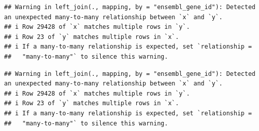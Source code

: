 \documentclass[
]{article}
\newenvironment{Shaded}{\begin{snugshade}}{\end{snugshade}}
\newcommand{\AttributeTok}[1]{\textcolor[rgb]{0.13,0.29,0.53}{#1}}
\newcommand{\CommentTok}[1]{\textcolor[rgb]{0.56,0.35,0.01}{\textit{#1}}}
\newcommand{\ConstantTok}[1]{\textcolor[rgb]{0.56,0.35,0.01}{#1}}
\newcommand{\DecValTok}[1]{\textcolor[rgb]{0.00,0.00,0.81}{#1}}
\newcommand{\FunctionTok}[1]{\textcolor[rgb]{0.13,0.29,0.53}{\textbf{#1}}}
\newcommand{\NormalTok}[1]{#1}
\newcommand{\OtherTok}[1]{\textcolor[rgb]{0.56,0.35,0.01}{#1}}
\newcommand{\SpecialCharTok}[1]{\textcolor[rgb]{0.81,0.36,0.00}{\textbf{#1}}}
\newcommand{\StringTok}[1]{\textcolor[rgb]{0.31,0.60,0.02}{#1}}
\begin{document}
\begin{verbatim}
## Warning in left_join(., mapping, by = "ensembl_gene_id"): Detected an unexpected many-to-many relationship between `x` and `y`.
## i Row 29428 of `x` matches multiple rows in `y`.
## i Row 23 of `y` matches multiple rows in `x`.
## i If a many-to-many relationship is expected, set `relationship =
##   "many-to-many"` to silence this warning.
\end{verbatim}

\begin{Shaded}
\end{Shaded}

\begin{verbatim}
## Warning in left_join(., mapping, by = "ensembl_gene_id"): Detected an unexpected many-to-many relationship between `x` and `y`.
## i Row 29428 of `x` matches multiple rows in `y`.
## i Row 23 of `y` matches multiple rows in `x`.
## i If a many-to-many relationship is expected, set `relationship =
##   "many-to-many"` to silence this warning.
\end{verbatim}

\begin{Shaded}
\end{Shaded}
\end{document}
